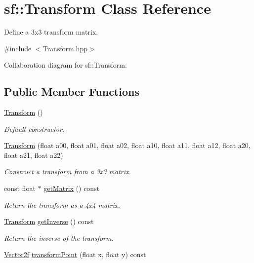 \hypertarget{classsf_1_1_transform}{}\section{sf\+:\+:Transform Class Reference}
\label{classsf_1_1_transform}


Define a 3x3 transform matrix.  




{\ttfamily \#include $<$Transform.\+hpp$>$}



Collaboration diagram for sf\+:\+:Transform\+:
\subsection*{Public Member Functions}
\begin{DoxyCompactItemize}
\item 
\hyperlink{classsf_1_1_transform_ac32de51bd0b9f3d52fbe0838225ee83b}{Transform} ()
\begin{DoxyCompactList}\small\item\em Default constructor. \end{DoxyCompactList}\item 
\hyperlink{classsf_1_1_transform_a78c48677712fcf41122d02f1301d71a3}{Transform} (float a00, float a01, float a02, float a10, float a11, float a12, float a20, float a21, float a22)
\begin{DoxyCompactList}\small\item\em Construct a transform from a 3x3 matrix. \end{DoxyCompactList}\item 
const float $\ast$ \hyperlink{classsf_1_1_transform_ad52616cac686f47bd26bcbdd8e2add40}{get\+Matrix} () const
\begin{DoxyCompactList}\small\item\em Return the transform as a 4x4 matrix. \end{DoxyCompactList}\item 
\hyperlink{classsf_1_1_transform}{Transform} \hyperlink{classsf_1_1_transform_a14f49e81af44aabcff7611f6703a1e4a}{get\+Inverse} () const
\begin{DoxyCompactList}\small\item\em Return the inverse of the transform. \end{DoxyCompactList}\item 
\hyperlink{classsf_1_1_vector2}{Vector2f} \hyperlink{classsf_1_1_transform_af2e38c3c077d28898686662558b41135}{transform\+Point} (float x, float y) const

\end{DoxyCompactItemize}

